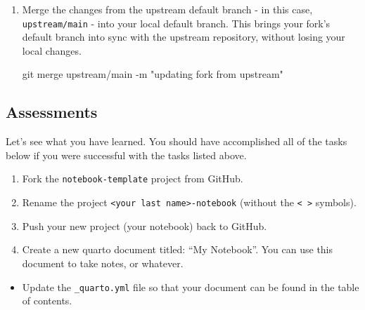 \documentclass[
  letterpaper,
  DIV=11,
  numbers=noendperiod]{scrreprt}
\newenvironment{Shaded}{\begin{snugshade}}{\end{snugshade}}
\newcommand{\AttributeTok}[1]{\textcolor[rgb]{0.40,0.45,0.13}{#1}}
\newcommand{\ExtensionTok}[1]{\textcolor[rgb]{0.00,0.23,0.31}{#1}}
\newcommand{\FunctionTok}[1]{\textcolor[rgb]{0.28,0.35,0.67}{#1}}
\newcommand{\NormalTok}[1]{\textcolor[rgb]{0.00,0.23,0.31}{#1}}
\newcommand{\OperatorTok}[1]{\textcolor[rgb]{0.37,0.37,0.37}{#1}}
\newcommand{\StringTok}[1]{\textcolor[rgb]{0.13,0.47,0.30}{#1}}
\providecommand{\tightlist}{%
  \setlength{\itemsep}{0pt}\setlength{\parskip}{0pt}}\usepackage{longtable,booktabs,array}
\begin{document}
\begin{enumerate}
\begin{Shaded}
\end{Shaded}
\item
  Merge the changes from the upstream default branch - in this case,
  \texttt{upstream/main} - into your local default branch. This brings
  your fork's default branch into sync with the upstream repository,
  without losing your local changes.

\begin{Shaded}
\begin{Highlighting}[]
\FunctionTok{git}\NormalTok{ merge upstream/main }\AttributeTok{{-}m} \StringTok{"updating fork from upstream"}
\end{Highlighting}
\end{Shaded}
\end{enumerate}

\subsection{Assessments}\label{assessments}

Let's see what you have learned. You should have accomplished all of the
tasks below if you were successful with the tasks listed above.

\begin{enumerate}
\def\labelenumi{\arabic{enumi}.}
\tightlist
\item
  Fork the \texttt{notebook-template} project from GitHub.
\item
  Rename the project
  \texttt{\textless{}your\ last\ name\textgreater{}-notebook} (without
  the \texttt{\textless{}\ \textgreater{}} symbols).
\item
  Push your new project (your notebook) back to GitHub.
\item
  Create a new quarto document titled: ``My Notebook''. You can use this
  document to take notes, or whatever.
\end{enumerate}

\begin{itemize}
\tightlist
\item
  Update the \texttt{\_quarto.yml} file so that your document can be
  found in the table of contents.
\end{itemize}
\end{document}
